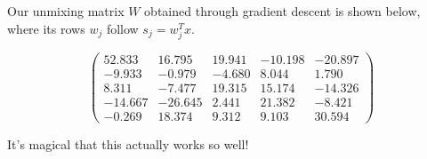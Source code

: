 %
%
\begin{answer}
	
Our unmixing matrix $W$ obtained through gradient descent is shown below, where its rows $w_j$ follow $s_j = w_j^T x$.

\begin{equation*}
\begin{pmatrix}
52.833& 16.795& 19.941& -10.198& -20.897\\
-9.933& -0.979& -4.680& 8.044& 1.790\\
8.311& -7.477& 19.315& 15.174& -14.326\\
-14.667& -26.645& 2.441& 21.382& -8.421\\
-0.269& 18.374& 9.312& 9.103& 30.594
\end{pmatrix}
\end{equation*}

It's magical that this actually works so well!

\end{answer}
%
